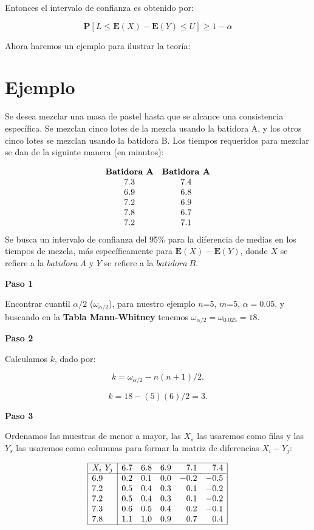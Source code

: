\documentclass[
  a4paper,
  oneside,
  openany]{book}
\begin{document}
Entonces el intervalo de confianza es obtenido por:

\[\mathbf{P}[L\leq \mathbf{E}(X)-\mathbf{E}(Y)\leq U]\geq 1-\alpha\]

Ahora haremos un ejemplo para ilustrar la teoría:

\hypertarget{ejemplo-6}{%
\section{Ejemplo}\label{ejemplo-6}}

Se desea mezclar una masa de pastel hasta que se alcance una consistencia específica. Se mezclan cinco lotes de la mezcla usando la batidora A, y los otros cinco lotes se mezclan usando la batidora B. Los tiempos requeridos para mezclar se dan de la siguinte manera (en minutos):

\[
\begin{array}{c c}
\textbf{Batidora A} & \textbf{Batidora A} \\
7.3 & 7.4 \\
6.9 & 6.8  \\
7.2 & 6.9 \\
7.8 & 6.7 \\
7.2 & 7.1 \\
\end{array}
\]
Se busca un intervalo de confianza del 95\% para la diferencia de medias en los tiempos de mezcla, más específicamente para \(\mathbf{E}(X)-\mathbf{E}(Y)\), donde \(X\) se refiere a la \(batidora\ A\) y \(Y\) se refiere a la \(batidora\ B\).

\textbf{Paso 1}

Encontrar cuantil \(\alpha/2\) (\(\omega_{\alpha/2}\)), para nuestro ejemplo \(n\)=5, \(m\)=5, \(\alpha=0.05\), y buscando en la \textbf{Tabla Mann-Whitney} tenemos \(\omega_{\alpha/2}=\omega_{0.025}=18.\)

\textbf{Paso 2}

Calculamos \(k\), dado por:

\[k= \omega_{\alpha/2}-n(n+1)/2.\]

\[k=18-(5)(6)/2=3.\]

\textbf{Paso 3}

Ordenamos las muestras de menor a mayor, las \(X_s\) las usaremos como filas y las \(Y_s\) las usaremos como columnas para formar la matriz de diferencias \(X_{i}-Y_{j}\):

\[
\begin{array}{|l| r r r r r|}
\hline
X_{i} \ Y_{j} & 6.7 & 6.8 & 6.9 & 7.1 & 7.4 \\
\hline
6.9 & 0.2 & 0.1 & 0.0 & -0.2 & -0.5 \\
7.2 & 0.5 & 0.4 & 0.3 &  0.1 & -0.2 \\
7.2 & 0.5 & 0.4 & 0.3 &  0.1 & -0.2 \\
7.3 & 0.6 & 0.5 & 0.4 &  0.2 & -0.1 \\
7.8 & 1.1 & 1.0 & 0.9 &  0.7 &  0.4 \\
\hline
\end{array}
\]
\end{document}
